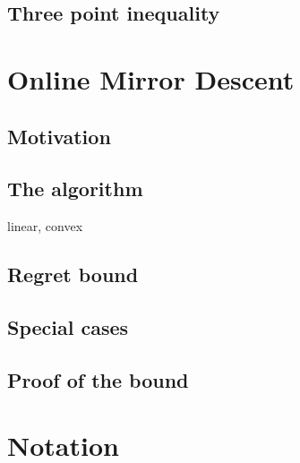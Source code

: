 \documentclass[11pt]{article}
\newtheorem{theorem}{Theorem}[section]
\newtheorem{lemma}[theorem]{Lemma}
\theoremstyle{definition}
\newtheorem{definition}[theorem]{Definition}
\theoremstyle{definition}
\newtheorem{example}[theorem]{Example}
\begin{document}
\subsection{Three point inequality}

\section{Online Mirror Descent}

\subsection{Motivation}

\subsection{The algorithm}
linear, convex

\subsection{Regret bound}

\subsection{Special cases}

\subsection{Proof of the bound}



%
%
%

\section{Notation }
\end{document}
